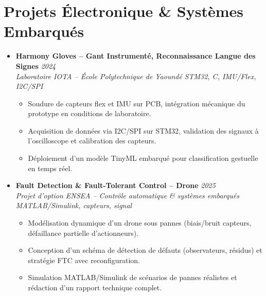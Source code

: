 \documentclass[a4paper,11pt]{article}
\begin{document}
\section{Projets Électronique \& Systèmes Embarqués}
\begin{itemize}[leftmargin=*, label={-}]

\item \textbf{Harmony Gloves -- Gant Instrumenté, Reconnaissance Langue des Signes} \hfill \textit{2024} \\
\textit{Laboratoire IOTA -- École Polytechnique de Yaoundé} \hfill \textit{STM32, C, IMU/Flex, I2C/SPI}
\vspace{-2pt}
    \begin{itemize}[leftmargin=0.4cm, nosep, label=\tiny$\bullet$]
        \item \small{Soudure de capteurs flex et IMU sur PCB, intégration mécanique du prototype en conditions de laboratoire.}
        \item \small{Acquisition de données via I2C/SPI sur STM32, validation des signaux à l'oscilloscope et calibration des capteurs.}
        \item \small{Déploiement d'un modèle TinyML embarqué pour classification gestuelle en temps réel.}
    \end{itemize}
\vspace{3pt}

\item \textbf{Fault Detection \& Fault-Tolerant Control -- Drone} \hfill \textit{2025} \\
\textit{Projet d'option ENSEA -- Contrôle automatique \& systèmes embarqués} \hfill \textit{MATLAB/Simulink, capteurs, signal}
\vspace{-2pt}
    \begin{itemize}[leftmargin=0.4cm, nosep, label=\tiny$\bullet$]
        \item \small{Modélisation dynamique d'un drone sous pannes (biais/bruit capteurs, défaillance partielle d'actionneurs).}
        \item \small{Conception d'un schéma de détection de défauts (observateurs, résidus) et stratégie FTC avec reconfiguration.}
        \item \small{Simulation MATLAB/Simulink de scénarios de pannes réalistes et rédaction d'un rapport technique complet.}
    \end{itemize}
\vspace{3pt}


\end{itemize}
\end{document}
